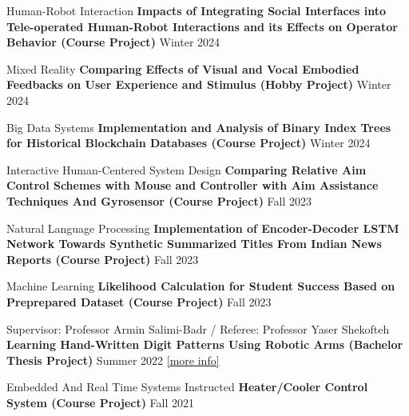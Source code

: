 
\begin{cventries}

    \cventry
    {Human-Robot Interaction}
    {\textbf {Impacts of Integrating Social Interfaces into Tele-operated Human-Robot Interactions and its Effects on Operator Behavior (Course Project)}}
    {}
    {Winter 2024}
    {}
    \vspace{0.35 cm}

    \cventry
    {Mixed Reality}
    {\textbf {Comparing Effects of Visual and Vocal Embodied Feedbacks on User Experience and Stimulus (Hobby Project)}}
    {}
    {Winter 2024}
    {}
    \vspace{0.35 cm}

    \cventry
    {Big Data Systems}
    {\textbf {Implementation and Analysis of Binary Index Trees for Historical Blockchain Databases (Course Project)}}
    {}
    {Winter 2024}
    {}
    \vspace{0.35 cm}

    \cventry
    {Interactive Human-Centered System Design}
    {\textbf {Comparing Relative Aim Control Schemes with Mouse and Controller with Aim Assistance Techniques And Gyrosensor (Course Project)}}
    {}
    {Fall 2023}
    {}
    \vspace{0.35 cm}

    \cventry
    {Natural Language Processing}
    {\textbf {Implementation of Encoder-Decoder LSTM Network Towards Synthetic Summarized Titles From Indian News Reports (Course Project)}}
    {}
    {Fall 2023}
    {}
    \vspace{0.35 cm}

    \cventry
    {Machine Learning}
    {\textbf {Likelihood Calculation for Student Success Based on Preprepared Dataset (Course Project)}}
    {}
    {Fall 2023}
    {}
    \vspace{0.35 cm}

    \cventry
    {Supervisor: Professor Armin Salimi-Badr / Referee: Professor Yaser Shekofteh}
    {\textbf {Learning Hand-Written Digit Patterns Using Robotic Arms (Bachelor Thesis Project)}}
    {}
    {Summer 2022}
    {\href{https://ph504.github.io/portfolio/portfolio-1/}{\textcolor{cobalt}{[more info]}}\newline}
    \vspace{0.35 cm}

    \cventry
    {Embedded And Real Time Systems Instructed}
    {\textbf {Heater/Cooler Control System (Course Project)}}
    {}
    {Fall 2021}
    {}
    \vspace{0.35 cm}
    

\end{cventries}
